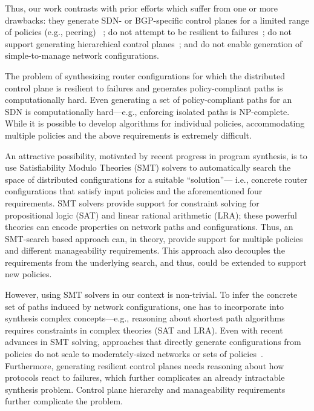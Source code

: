 Thus, our work contrasts with prior efforts which suffer
from one or more drawbacks: they generate SDN- or BGP-specific
control planes for a limited range of policies (e.g., peering)
~\cite{netkat,merlin,netegg,fattire,simple,sol,propane}; do not
attempt to be resilient to failures~\cite{synet}; 
do not support generating
hierarchical control planes~\cite{propane}; 
and do not enable generation of
simple-to-manage network configurations. 

The problem of synthesizing router configurations for which the
distributed control plane is resilient to failures and generates
policy-compliant paths is computationally hard. Even generating a set
of policy-compliant paths for an SDN is computationally hard---e.g.,
enforcing isolated paths is NP-complete. While it is possible to
develop algorithms for individual policies, accommodating multiple
policies and the above requirements is extremely difficult.


An attractive possibility, motivated by recent progress in program
synthesis, is to use
Satisfiability Modulo Theories (SMT) solvers to automatically search
the space of distributed configurations for a suitable ``solution''---
i.e., concrete router configurations that satisfy input policies and
the aforementioned four requirements. SMT solvers provide support for
constraint solving for propositional logic (SAT) and linear rational
arithmetic (LRA); these powerful theories can  
encode properties on network paths 
and configurations. Thus, an SMT-search based approach can, in theory,
provide support for multiple policies and different manageability requirements. 
This approach also decouples the requirements from the underlying search, 
and thus, could be extended to support new policies. 

However, using SMT solvers in our context is
non-trivial.  To infer the concrete set of paths induced by network
configurations, one has to incorporate into synthesis complex
concepts---e.g., reasoning about shortest path algorithms requires
constraints in complex theories (SAT and LRA).  Even with recent
advances in SMT solving, approaches that directly generate
configurations from policies do not scale to moderately-sized networks
or sets of policies~\cite{synet}. Furthermore, generating resilient
control planes needs reasoning about how protocols react to failures,
which further complicates an already intractable synthesis
problem. Control plane hierarchy and manageability requirements further
complicate the problem.

